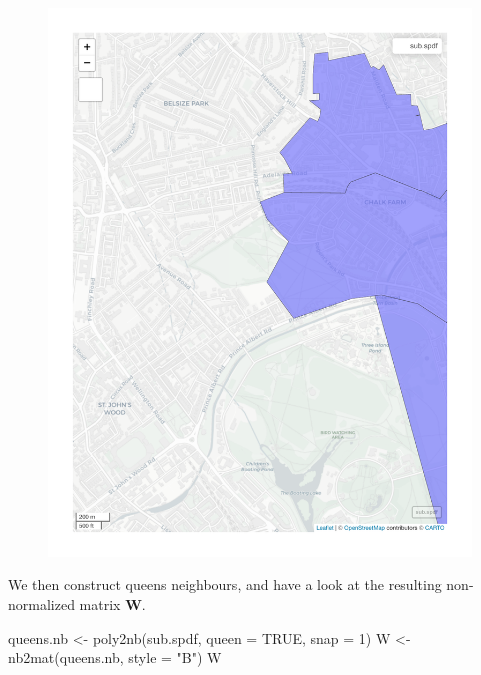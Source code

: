 \documentclass[
  letterpaper,
  DIV=11,
  numbers=noendperiod]{scrreprt}
\newenvironment{Shaded}{\begin{snugshade}}{\end{snugshade}}
\newcommand{\AttributeTok}[1]{\textcolor[rgb]{0.40,0.45,0.13}{#1}}
\newcommand{\ConstantTok}[1]{\textcolor[rgb]{0.56,0.35,0.01}{#1}}
\newcommand{\DecValTok}[1]{\textcolor[rgb]{0.68,0.00,0.00}{#1}}
\newcommand{\FunctionTok}[1]{\textcolor[rgb]{0.28,0.35,0.67}{#1}}
\newcommand{\NormalTok}[1]{\textcolor[rgb]{0.00,0.23,0.31}{#1}}
\newcommand{\OtherTok}[1]{\textcolor[rgb]{0.00,0.23,0.31}{#1}}
\newcommand{\StringTok}[1]{\textcolor[rgb]{0.13,0.47,0.30}{#1}}
\begin{document}
\begin{figure}[H]

{\centering \includegraphics{05_regression-theory_files/figure-pdf/unnamed-chunk-4-1.pdf}

}

\end{figure}

We then construct queens neighbours, and have a look at the resulting
non-normalized matrix \(\boldsymbol{\mathbf{W}}\).

\begin{Shaded}
\begin{Highlighting}[]
\NormalTok{queens.nb }\OtherTok{\textless{}{-}} \FunctionTok{poly2nb}\NormalTok{(sub.spdf, }\AttributeTok{queen =} \ConstantTok{TRUE}\NormalTok{, }\AttributeTok{snap =} \DecValTok{1}\NormalTok{)}
\NormalTok{W }\OtherTok{\textless{}{-}} \FunctionTok{nb2mat}\NormalTok{(queens.nb, }\AttributeTok{style =} \StringTok{"B"}\NormalTok{)}
\NormalTok{W}
\end{Highlighting}
\end{Shaded}
\end{document}
